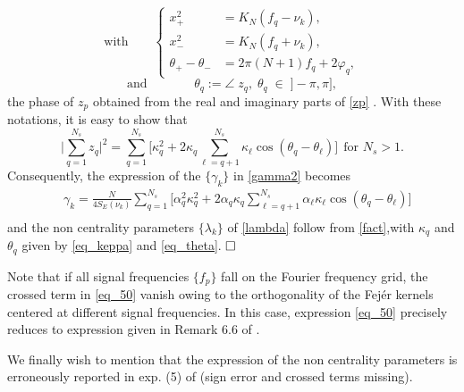 \documentclass[journal]{IEEEtran}
\begin{document}
$$
\text{with}~~~~~~~~~
\left\{
 \begin{aligned}
 	x_{+}^2 &= K_N(f_q - \nu_k), \\
	x_{-}^2 &= K_N(f_q+ \nu_k) , \\
	\theta_+-\theta_{-} &=   2 \pi (N+1) f_q + 2 \varphi_q,
 \end{aligned}
 \right.
$$
\begin{equation} 
\text{and}~~~~~~~~~~~~~~~~~ \theta_q   := \angle\; z_q ,\; \theta_q\; \in\;]-\pi, \pi],
  \label{eq_theta}
  \end{equation} 
  the phase of $z_p$ obtained from the real and imaginary parts of \eqref{zp} \cite{Kasana_2005}.
With these notations, it  is easy to show that 
 $$
 \Big| \sum_{q=1}^{N_s} z_q \Big|^2 = \sum_{q=1}^{N_s} \Big[ \kappa_q^2 + 2  \kappa_q \sum_{\ell = q+1}^{N_s} \kappa_\ell \cos(\theta_q-\theta_\ell)  \Big] ~~ \text{for $N_s>1$}.
 $$
Consequently, the  expression of the $\{\gamma_k\}$ in \eqref{gamma2} becomes 
\begin{equation} 
	 \begin{aligned}
		&\gamma_k \!=\!  \frac{N}{4 S_E(\nu_k)} \! \! \sum_{q=1}^{N_s} \!\! \Big[  \alpha_q^2 \kappa_q ^2 \!\!+\! 2\alpha_q \kappa_q\!\! \sum_{\ell = q+1}^{N_s}\!\! \! \alpha_\ell \kappa_\ell  \!\cos(\theta_q-\theta_\ell )\Big]	\\
	\end{aligned}
 \label{eq_50}	
\end{equation} 
 and  the non centrality parameters $\{\lambda_k\}$ of \eqref{lambda} follow from \eqref{fact},with $\kappa_q$ and $\theta_q$  given by \eqref{eq_keppa} and \eqref{eq_theta}.  ${\hfill\ensuremath{\square}}$

Note that if all signal frequencies $\{f_p\}$ fall on the Fourier frequency grid, the crossed term in \eqref{eq_50} vanish owing to the orthogonality
of the Fej\'er kernels centered at different signal frequencies. In this case, expression \eqref{eq_50} precisely reduces to expression given in Remark 6.6 of \cite{Li_2014}.

We finally wish to mention that the expression of the non centrality parameters is erroneously reported in exp. (5) of  \cite{Sulis_2016a} (sign error and crossed terms missing).
\end{document}
